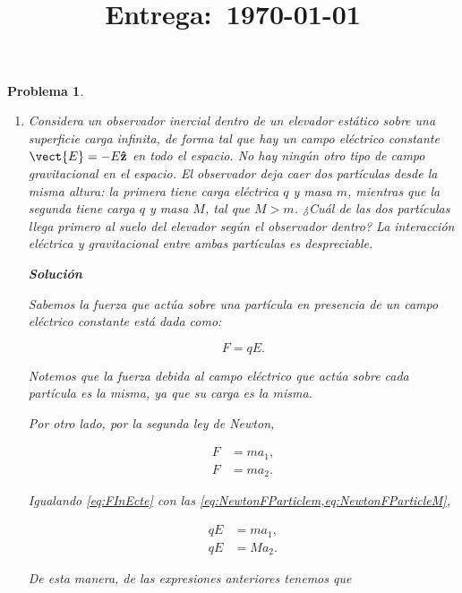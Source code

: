 \documentclass[12pt]{article}
\title{
    \textbf{\homeworknumber}\\
    \normalsize\vspace{0.1in}\small{\textbf{Entrega}:~\today}
    \vspace{-1.5in}
}
\author{}
\date{}
\theoremstyle{break}
\newtheorem{exercise}{Problema}
\theoremstyle{nonumberbreak}
\DeclareRobustCommand{\uvec}[1]{{%
  \ifcsname uvec#1\endcsname
     \csname uvec#1\endcsname
   \else
    \bm{\hat{\mathbf{#1}}}%
   \fi
}}%
\newcommand*{\inlinesol}{\vspace*{10pt}\textbf{Solución}\vspace*{10pt}}
\begin{document}
    \maketitle
    \thispagestyle{fancy}
    
    \begin{exercise}
        \begin{enumerate}[label = \alph*)]
            \item Considera un observador inercial dentro de un elevador estático sobre una superficie carga infinita, de forma tal que hay un campo eléctrico constante \(\vect{E} = -E \uvec{z}\) en todo el espacio. No hay ningún otro tipo de campo gravitacional en el espacio. El observador deja caer dos partículas desde la misma altura: la primera tiene carga eléctrica \(q\) y masa \(m\), mientras que la segunda tiene carga \(q\) y masa \(M\), tal que \(M > m\). ¿Cuál de las dos partículas llega primero al suelo del elevador según el observador dentro? La interacción eléctrica y gravitacional entre ambas partículas es despreciable.

            \inlinesol

            Sabemos la fuerza que actúa sobre una partícula en presencia de un campo eléctrico constante está dada como:

            \begin{equation}
                F = qE.
                \label{eq:FInEcte}
            \end{equation}

            Notemos que la fuerza debida al campo eléctrico que actúa sobre cada partícula es la misma, ya que su carga es la misma.

            Por otro lado, por la segunda ley de Newton, 

            \begin{align}
                F &= ma_{1},\label{eq:NewtonFParticlem}\\
                F &= ma_{2}.\label{eq:NewtonFParticleM}
            \end{align}
            
            Igualando \cref{eq:FInEcte} con las \cref{eq:NewtonFParticlem,eq:NewtonFParticleM},

            \begin{align*}
                qE &= ma_{1},\\
                qE &= Ma_{2}.
            \end{align*}

            De esta manera, de las expresiones anteriores tenemos que


\end{enumerate}
\end{exercise}
\end{document}
